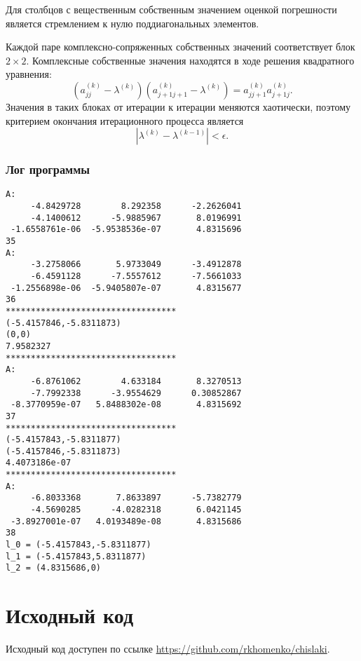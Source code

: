 \documentclass[a4paper,12pt]{article}
\begin{document}
Для столбцов с вещественным собственным значением оценкой
погрешности является стремлением к нулю поддиагональных
элементов.

Каждой паре комплексно-сопряженных собственных значений соответствует
блок $2 \times 2$. Комплексные собственные значения находятся в ходе
решения квадратного уравнения:
$$
(a^{(k)}_{jj} - \lambda^{(k)})(a^{(k)}_{j + 1 j + 1} - \lambda^{(k)}) = a^{(k)}_{j j+1} a^{(k)}_{j + 1 j}.
$$
Значения в таких блоках от итерации к итерации меняются хаотически, поэтому
критерием окончания итерационного процесса является
$$
|\lambda^{(k)} - \lambda^{(k - 1)}| < \epsilon.
$$

\subsubsection{Лог программы}
\begin{verbatim}
A:
     -4.8429728        8.292358      -2.2626041 
     -4.1400612      -5.9885967       8.0196991 
 -1.6558761e-06  -5.9538536e-07       4.8315696 
35
A:
     -3.2758066       5.9733049      -3.4912878 
     -6.4591128      -7.5557612      -7.5661033 
 -1.2556898e-06  -5.9405807e-07       4.8315677 
36
**********************************
(-5.4157846,-5.8311873)
(0,0)
7.9582327
**********************************
A:
     -6.8761062        4.633184       8.3270513 
     -7.7992338      -3.9554629      0.30852867 
 -8.3770959e-07   5.8488302e-08       4.8315692 
37
**********************************
(-5.4157843,-5.8311877)
(-5.4157846,-5.8311873)
4.4073186e-07
**********************************
A:
     -6.8033368       7.8633897      -5.7382779 
     -4.5690285      -4.0282318       6.0421145 
 -3.8927001e-07   4.0193489e-08       4.8315686 
38
l_0 = (-5.4157843,-5.8311877)
l_1 = (-5.4157843,5.8311877)
l_2 = (4.8315686,0)
\end{verbatim}

\newpage

\section{Исходный код}
Исходный код доступен по ссылке
\url{https://github.com/rkhomenko/chislaki}.









\end{document}
